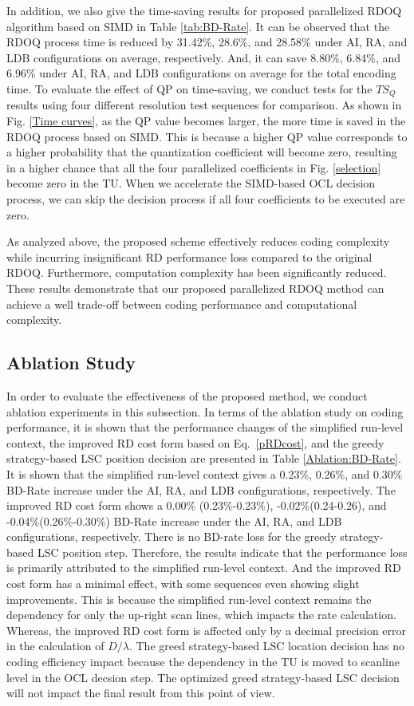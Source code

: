 \documentclass[lettersize,journal]{IEEEtran}
\begin{document}
In addition, we also give the time-saving results for proposed parallelized RDOQ algorithm based on SIMD in Table \ref{tab:BD-Rate}. It can be observed that the RDOQ process time is reduced by 31.42\%, 28.6\%, and 28.58\% under AI, RA, and LDB configurations on average, respectively. And, it can save 8.80\%, 6.84\%, and 6.96\% under AI, RA, and LDB configurations on average for the total encoding time. To evaluate the effect of QP on time-saving, we conduct tests for the $TS_{Q}$ results using four different resolution test sequences for comparison. As shown in Fig. \ref{Time curves}, as the QP value becomes larger, the more time is saved in the RDOQ process based on SIMD. This is because a higher QP value corresponds to a higher probability that the quantization coefficient will become zero, resulting in a higher chance that all the four parallelized coefficients in Fig. \ref{selection} become zero in the TU. When we accelerate the SIMD-based OCL decision process, we can skip the decision process if all four coefficients to be executed are zero. 

As analyzed above, the proposed scheme effectively reduces coding complexity while incurring insignificant RD performance loss compared to the original RDOQ. Furthermore, computation complexity has been significantly reduced. These results demonstrate that our proposed parallelized RDOQ method can achieve a well trade-off between coding performance and computational complexity. 

\subsection{Ablation Study}
In order to evaluate the effectiveness of the proposed method, we conduct ablation experiments in this subsection. In terms of the ablation study on coding performance, it is shown that the performance changes of the simplified run-level context, the improved RD cost form based on Eq.~\eqref{pRDcost}, and the greedy strategy-based LSC position decision are presented in Table \ref{Ablation:BD-Rate}. It is shown that the simplified run-level context gives a 0.23\%, 0.26\%, and 0.30\% BD-Rate increase under the AI, RA, and LDB configurations, respectively. The improved RD cost form shows a 0.00\% (0.23\%-0.23\%), -0.02\%(0.24-0.26), and -0.04\%(0.26\%-0.30\%) BD-Rate increase under the AI, RA, and LDB configurations, respectively. There is no BD-rate loss for the greedy strategy-based LSC position step. Therefore, the results indicate that the performance loss is primarily attributed to the simplified run-level context. And the improved RD cost form has a minimal effect, with some sequences even showing slight improvements. This is because the simplified run-level context remains the dependency for only the up-right scan lines, which impacts the rate calculation. Whereas, the improved RD cost form is affected only by a decimal precision error in the calculation of $D/\lambda$. The greed strategy-based LSC location decision has no coding efficiency impact because the dependency in the TU is moved to scanline level in the OCL decsion step. The optimized greed strategy-based LSC decision will not impact the final result from this point of view. 
\end{document}
